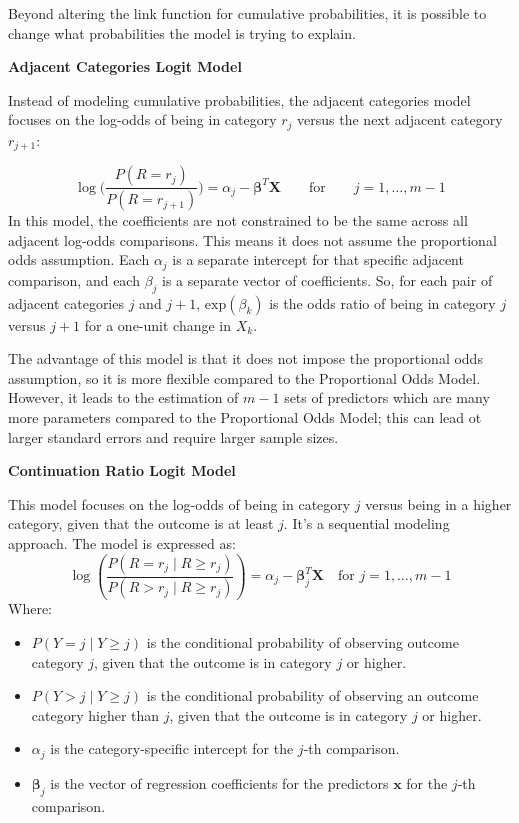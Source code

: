 \documentclass[
  letterpaper,
  DIV=11,
  numbers=noendperiod]{scrartcl}
\providecommand{\tightlist}{%
  \setlength{\itemsep}{0pt}\setlength{\parskip}{0pt}}\usepackage{longtable,booktabs,array}
\begin{document}
Beyond altering the link function for cumulative probabilities, it is
possible to change what probabilities the model is trying to explain.

\textbf{Adjacent Categories Logit Model}

Instead of modeling cumulative probabilities, the adjacent categories
model focuses on the log-odds of being in category \(r_j\) versus the
next adjacent category \(r_{j+1}\):

\[
\log \Bigg(\frac{P(R = r_j)}{P(R = r_{j+1})}\Bigg) = \alpha_j - \boldsymbol{\beta}^T\boldsymbol{X} \qquad \text{for} \qquad j = 1,\dots,m-1
\] In this model, the coefficients are not constrained to be the same
across all adjacent log-odds comparisons. This means it does not assume
the proportional odds assumption. Each \(\alpha_j\) is a separate
intercept for that specific adjacent comparison, and each \(\beta_j\) is
a separate vector of coefficients. So, for each pair of adjacent
categories \(j\) and \(j+1\), \(\text{exp}(\beta_k)\) is the odds ratio
of being in category \(j\) versus \(j+1\) for a one-unit change in
\(X_k\).

The advantage of this model is that it does not impose the proportional
odds assumption, so it is more flexible compared to the Proportional
Odds Model. However, it leads to the estimation of \(m-1\) sets of
predictors which are many more parameters compared to the Proportional
Odds Model; this can lead ot larger standard errors and require larger
sample sizes.

\textbf{Continuation Ratio Logit Model}

This model focuses on the log-odds of being in category \(j\) versus
being in a higher category, given that the outcome is at least \(j\).
It's a sequential modeling approach. The model is expressed as: \[ 
\log\left(\frac{P(R = r_j \mid R \ge r_j)}{P(R > r_j \mid R \ge r_j)}\right) = \alpha_j - \boldsymbol{\beta}_j^T \mathbf{X} \quad \text{for } j=1, \dots, m-1 
\] Where:

\begin{itemize}
\tightlist
\item
  \(P(Y = j \mid Y \ge j)\) is the conditional probability of observing
  outcome category \(j\), given that the outcome is in category \(j\) or
  higher.
\item
  \(P(Y > j \mid Y \ge j)\) is the conditional probability of observing
  an outcome category higher than \(j\), given that the outcome is in
  category \(j\) or higher.
\item
  \(\alpha_j\) is the category-specific intercept for the \(j\)-th
  comparison.
\item
  \(\boldsymbol{\beta}_j\) is the vector of regression coefficients for
  the predictors \(\mathbf{x}\) for the \(j\)-th comparison.
\end{itemize}
\end{document}

